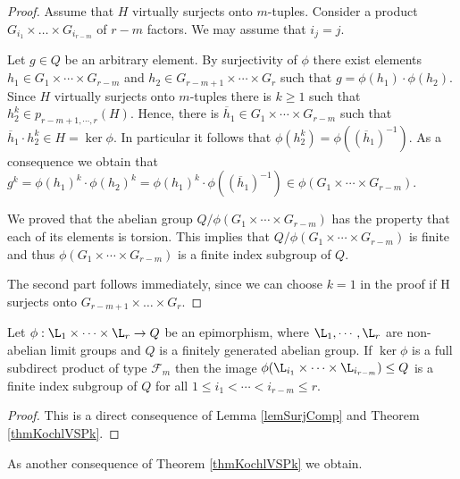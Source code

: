 \begin{proof}
 Assume that $H$ virtually surjects onto $m$-tuples. Consider a product $G_{i_1}\times \dots \times G_{i_{r-m}}$ of $r-m$ factors. We may assume that $i_j=j$.
 
Let $g\in Q$ be an arbitrary element. By surjectivity of $\phi$ there exist elements $h_1\in G_1\times \cdots \times G_{r-m}$ and $h_2 \in G_{r-m+1}\times \cdots \times G_r$ such that $g=\phi(h_1)\cdot \phi(h_2)$. Since $H$ virtually surjects onto $m$-tuples there is $k\geq 1$ such that $h_2^k\in p_{r-m+1,\cdots,r}(H)$. Hence, there is $\overline{h}_1\in G_{1}\times \cdots \times G_{r-m}$ such that $\overline{h}_1 \cdot h_2^k\in H=\ker \phi$. In particular it follows that $\phi(h_2^k)=\phi((\overline{h}_1)^{-1})$. As a consequence we obtain that $g^k = \phi(h_1)^k \cdot \phi(h_2)^k = \phi(h_1)^k\cdot \phi((\overline{h}_1)^{-1})\in \phi(G_{1}\times \cdots \times G_{r-m})$.

We proved that the abelian group $Q/\phi(G_{1}\times \cdots \times G_{r-m})$ has the property that each of its elements is torsion. This implies that $Q/\phi(G_{1}\times \cdots \times G_{r-m})$ is finite and thus $\phi(G_{1}\times \cdots \times G_{r-m})$ is a finite index subgroup of $Q$.

The second part follows immediately, since we can choose $k=1$ in the proof if H surjects onto $G_{r-m+1}\times \dots \times G_r$.
\end{proof}


\begin{corollary}
 Let $\phi: \L_1 \times \cdots \times \L_r\rightarrow Q$ be an epimorphism, where $\L _1,\cdots,\L_r$ are non-abelian limit groups and $Q$ is a finitely generated abelian group. If $\ker \phi$ is a full subdirect product of type $\mathcal{F}_m$ then the image $\phi(\L_{i_1} \times \cdots \times \L_{i_{r-m}})\leq Q$ is a finite index subgroup of $Q$ for all $1\leq i_1< \cdots < i_{r-m}\leq r$.
 \label{propCoNilpFm}
\end{corollary}
\begin{proof}
This is a direct consequence of Lemma \ref{lemSurjComp} and Theorem \ref{thmKochlVSPk}.
\end{proof}



As another consequence of Theorem \ref{thmKochlVSPk} we obtain. 

